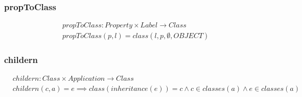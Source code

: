 \documentclass[10pt]{article}
\begin{document}
\subsubsection{propToClass}
\begin{align}
& propToClass: Property \times Label \rightarrow Class \\
& propToClass(p, l) = class(l, p, \emptyset, OBJECT)
\end{align}

\subsubsection{childern}
\begin{align}
& childern : Class \times Application \rightarrow Class \\
& childern(c, a) = e \implies class(inheritance(e)) = c \land c \in classes(a) \land e \in classes(a)
\end{align}
\end{document}

